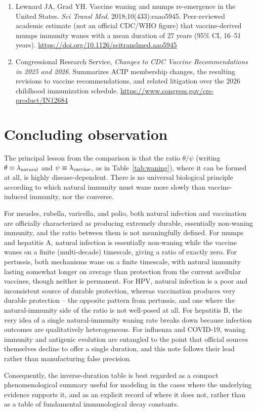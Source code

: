 \documentclass[11pt]{article}
\begin{document}
\begin{enumerate}
\item \label{ref:lewnard-grad} Lewnard JA, Grad YH. Vaccine waning and
mumps re-emergence in the United States. \emph{Sci Transl Med}.
2018;10(433):eaao5945. Peer-reviewed academic estimate (not an official
CDC/WHO figure) that vaccine-derived mumps immunity wanes with a mean
duration of 27 years (95\% CI, 16--51 years).
\url{https://doi.org/10.1126/scitranslmed.aao5945}

\item \label{ref:crs-acip} Congressional Research Service, \emph{Changes
to CDC Vaccine Recommendations in 2025 and 2026}. Summarizes ACIP
membership changes, the resulting revisions to vaccine recommendations,
and related litigation over the 2026 childhood immunization schedule.
\url{https://www.congress.gov/crs-product/IN12684}

\end{enumerate}

\section{Concluding observation}

The principal lesson from the comparison is that the ratio $\theta/\psi$
(writing $\theta \equiv \lambda_{\rm natural}$ and $\psi \equiv
\lambda_{\rm vaccine}$, as in Table~\ref{tab:waning}), where it can be
formed at all, is highly disease-dependent. There is no universal
biological principle according to which natural immunity must wane more
slowly than vaccine-induced immunity, nor the converse.

For measles, rubella, varicella, and polio, both natural infection and
vaccination are officially characterized as producing extremely durable,
essentially non-waning immunity, and the ratio between them is not
meaningfully defined. For mumps and hepatitis A, natural infection is
essentially non-waning while the vaccine wanes on a finite (multi-decade)
timescale, giving a ratio of exactly zero. For pertussis, both mechanisms
wane on a finite timescale, with natural immunity lasting somewhat longer
on average than protection from the current acellular vaccines, though
neither is permanent. For HPV, natural infection is a poor and inconsistent
source of durable protection, whereas vaccination produces very durable
protection -- the opposite pattern from pertussis, and one where the
natural-immunity side of the ratio is not well-posed at all. For hepatitis
B, the very idea of a single natural-immunity waning rate breaks down
because infection outcomes are qualitatively heterogeneous. For influenza
and COVID-19, waning immunity and antigenic evolution are entangled to the
point that official sources themselves decline to offer a single duration,
and this note follows their lead rather than manufacturing false precision.

Consequently, the inverse-duration table is best regarded as a compact
phenomenological summary useful for modeling in the cases where the
underlying evidence supports it, and as an explicit record of where it does
not, rather than as a table of fundamental immunological decay constants.
\end{document}

